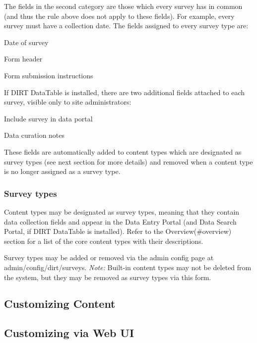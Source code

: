 The fields in the second category are those which every survey has in common (and thus the rule above does not apply to these fields). For example, every survey must have a collection date. The fields assigned to every survey type are\+:


\begin{DoxyItemize}
\item Date of survey
\item Form header
\item Form submission instructions
\end{DoxyItemize}

If D\+I\+RT Data\+Table is installed, there are two additional fields attached to each survey, visible only to site administrators\+:


\begin{DoxyItemize}
\item Include survey in data portal
\item Data curation notes
\end{DoxyItemize}

These fields are automatically added to content types which are designated as survey types (see next section for more details) and removed when a content type is no longer assigned as a survey type.

\subsubsection*{Survey types}

Content types may be designated as survey types, meaning that they contain data collection fields and appear in the Data Entry Portal (and Data Search Portal, if D\+I\+RT Data\+Table is installed). Refer to the Overview(\#overview) section for a list of the core content types with their descriptions.

Survey types may be added or removed via the admin config page at admin/config/dirt/surveys. {\itshape Note\+:} Built-\/in content types may not be deleted from the system, but they may be removed as survey types via this form.

\subsection*{Customizing Content}

\subsection*{Customizing via Web UI}


